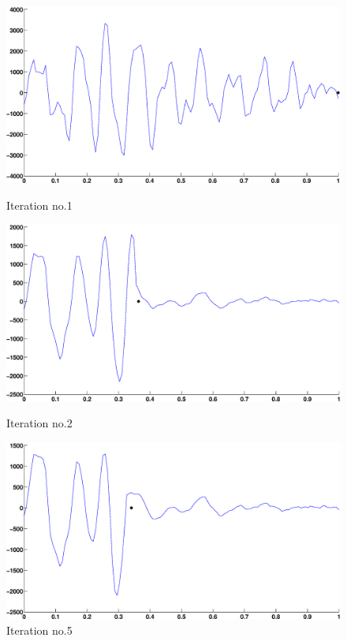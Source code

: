 \documentclass[12pt,a4]{article}
\begin{document}
\begin{figure}[H]
\begin{center}
 \includegraphics[scale=.35]{img/Approx_iter_onePer-v3-1.eps}
 \caption{Iteration no.1}
 \includegraphics[scale=.35]{img/Approx_iter_onePer-v3-2.eps}
 \caption{Iteration no.2}
 \includegraphics[scale=.35]{img/Approx_iter_onePer-v3-3.eps}
 \caption{Iteration no.5}\label{fig:app3-end}
\end{center}
\end{figure}

\end{document}
